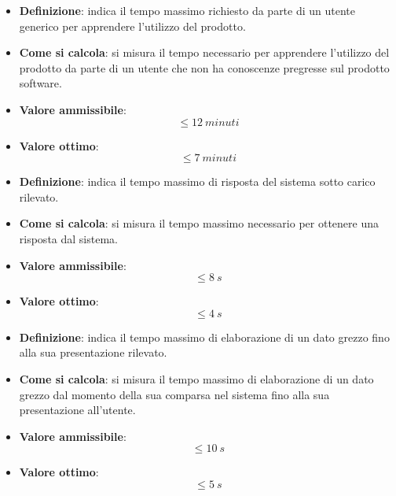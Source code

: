 \begin{itemize}
	\item \textbf{Definizione}: indica il tempo massimo richiesto da parte di un utente generico per apprendere l'utilizzo del prodotto.
	\item \textbf{Come si calcola}: si misura il tempo necessario per apprendere l'utilizzo del prodotto da parte di un utente che non ha conoscenze pregresse sul prodotto software.
	\item \textbf{Valore ammissibile}: \begin{equation*}\leq 12\ minuti\end{equation*}
	\item \textbf{Valore ottimo}: \begin{equation*}\leq 7\ minuti\end{equation*}
\end{itemize}

\begin{itemize}
	\item \textbf{Definizione}: indica il tempo massimo di risposta del sistema sotto carico rilevato.
	\item \textbf{Come si calcola}: si misura il tempo massimo necessario per ottenere una risposta dal sistema.
	\item \textbf{Valore ammissibile}: \begin{equation*}\leq 8\ s\end{equation*}
	\item \textbf{Valore ottimo}: \begin{equation*}\leq 4\ s\end{equation*}
\end{itemize}

\begin{itemize}
	\item \textbf{Definizione}: indica il tempo massimo di elaborazione di un dato grezzo fino alla sua presentazione rilevato.
	\item \textbf{Come si calcola}: si misura il tempo massimo di elaborazione di un dato grezzo dal momento della sua comparsa nel sistema fino alla sua presentazione all'utente.
	\item \textbf{Valore ammissibile}: \begin{equation*}\leq 10\ s\end{equation*}
	\item \textbf{Valore ottimo}: \begin{equation*}\leq 5\ s\end{equation*}
\end{itemize}

